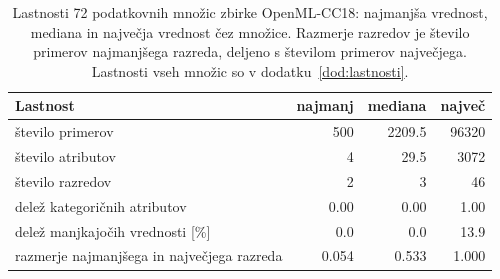 \begin{table}[htbp]
\centering
\caption{Lastnosti 72 podatkovnih množic zbirke OpenML-CC18: najmanjša vrednost, mediana in največja vrednost čez množice. Razmerje razredov je število primerov najmanjšega razreda, deljeno s številom primerov največjega. Lastnosti vseh množic so v dodatku~\ref{dod:lastnosti}.}
\label{tab:cc18-opis}
\small
\begin{tabular}{lrrr}
\hline
Lastnost & najmanj & mediana & največ \\
\hline
število primerov & \num{500} & \num{2209.5} & \num{96320} \\
število atributov & \num{4} & \num{29.5} & \num{3072} \\
število razredov & \num{2} & \num{3} & \num{46} \\
delež kategoričnih atributov & \num{0.00} & \num{0.00} & \num{1.00} \\
delež manjkajočih vrednosti [\%] & \num{0.0} & \num{0.0} & \num{13.9} \\
razmerje najmanjšega in največjega razreda & \num{0.054} & \num{0.533} & \num{1.000} \\
\hline
\end{tabular}
\end{table}
